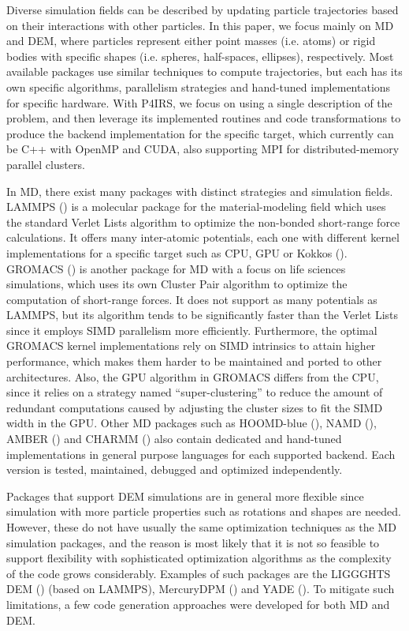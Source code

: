 \documentclass[Afour,sageh,times]{sagej}
\newcommand{\RMchange}[1]{{\color{blue} #1}}
\begin{document}
Diverse simulation fields can be described by updating particle trajectories based on their interactions with other particles.
In this paper, we focus mainly on \ac{MD} and \ac{DEM}, where particles represent either point masses (i.e. atoms) or rigid bodies with specific shapes (i.e. spheres, half-spaces, ellipses), respectively.
Most available packages use similar techniques to compute trajectories, but each \RMchange{has its} own specific algorithms, parallelism strategies and hand-tuned implementations for specific hardware.
With P4IRS, we focus on using a single description of the problem, and then leverage its implemented routines and code transformations to produce the backend implementation for the specific target, which currently can be C++ with OpenMP and CUDA, also supporting MPI for distributed-memory parallel clusters.

In MD, there exist many packages with distinct strategies and simulation fields.
LAMMPS (\cite{lammps1,lammps2}) is a molecular package for the material-modeling field which uses the standard Verlet Lists algorithm to optimize the non-bonded short-range force calculations.
It offers many inter-atomic potentials, each one with different kernel implementations for a specific target such as CPU, GPU or Kokkos (\cite{kokkos}).
GROMACS (\cite{gromacs1,gromacs2}) is another package for MD with \RMchange{a} focus on \RMchange{life sciences simulations,} which uses its own Cluster Pair algorithm to optimize the \RMchange{computation of} short-range forces.
It does not support as many potentials as LAMMPS, but its algorithm tends to be significantly faster than the Verlet Lists since it employs SIMD parallelism more efficiently.
Furthermore, the optimal GROMACS kernel implementations rely on SIMD intrinsics to attain higher performance, which makes them harder to be maintained and ported to other architectures.
Also, the GPU algorithm in GROMACS differs from the CPU, since it relies on a strategy named ``super-clustering'' to reduce the amount of redundant computations caused by adjusting the cluster sizes to fit the SIMD width in the GPU.
Other MD packages such as HOOMD-blue (\cite{hoomdblue}), NAMD (\cite{namd}), AMBER (\cite{amber1}) and CHARMM (\cite{charmm}) also contain dedicated and hand-tuned implementations in general purpose languages for each supported backend.
Each version is tested, maintained, debugged and optimized independently.

Packages that support DEM simulations are in general more flexible since simulation with more particle properties such as rotations and shapes are needed.
However, these do not have usually the same optimization techniques as the MD simulation packages, and the reason is most likely that it is not so feasible to support flexibility with sophisticated optimization algorithms as the complexity of the code grows considerably.
Examples of such packages are the LIGGGHTS DEM (\cite{liggghts}) (based on LAMMPS), MercuryDPM (\cite{mercurydpm}) and YADE (\cite{yade}).
To mitigate such limitations, a few code generation approaches were developed for both MD and DEM.
\end{document}
